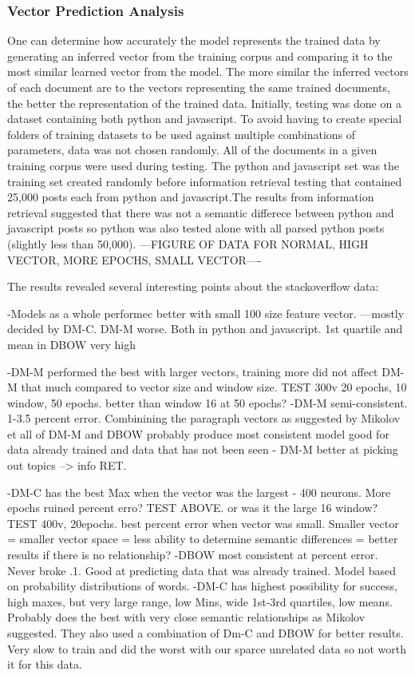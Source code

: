 \subsubsection{Vector Prediction Analysis}

One can determine how accurately the model represents the trained data by generating an inferred vector from the training corpus and comparing it to the most similar learned vector from the model. The more similar the inferred vectors of each document are to the vectors representing the same trained documents, the better the representation of the trained data. Initially, testing was done on a dataset containing both python and javascript. To avoid having to create special folders of training datasets to be used against multiple combinations of parameters, data was not chosen randomly. All of the documents in a given training corpus were used during testing. The python and javascript set was the training set created randomly before information retrieval testing that contained 25,000 posts each from python and javascript.The results from information retrieval suggested that there was not a semantic differece between python and javascript posts so python was also tested alone with all parsed python posts (slightly less than 50,000). ---FIGURE OF DATA FOR NORMAL, HIGH VECTOR, MORE EPOCHS, SMALL VECTOR----

The results revealed several interesting points about the stackoverflow data:

-Models as a whole performec better with small 100 size feature vector. ---mostly decided by DM-C. DM-M worse. Both in python and javascript. 1st quartile and mean in DBOW very high

-DM-M performed the best with larger vectors, training more did not affect DM-M that much compared to vector size and window size. TEST 300v 20 epochs, 10 window, 50 epochs. better than window 16 at 50 epochs? 
-DM-M semi-consistent. 1-3.5 percent error. Combinining the paragraph vectors as suggested by Mikolov et all of DM-M and DBOW probably produce most consistent model good for data already trained and data that has not been seen - DM-M better at picking out topics  --> info RET.

-DM-C has the best Max when the vector was the largest - 400 neurons. More epochs ruined percent erro? TEST ABOVE. or was it the large 16 window? TEST 400v, 20epochs. best percent error when vector was small. Smaller vector = smaller vector space = less ability to determine semantic differences = better results if there is no relationship? -DBOW most consistent at percent error. Never broke .1. Good at predicting data that was already trained. Model based on probability distributions of words.
-DM-C has highest possibility for success, high maxes, but very large range, low Mins, wide 1st-3rd quartiles, low means. Probably does the best with very close semantic relationships as Mikolov suggested. They also used a combination of Dm-C and DBOW for better results. Very slow to train and did the worst with our sparce unrelated data so not worth it for this data.


